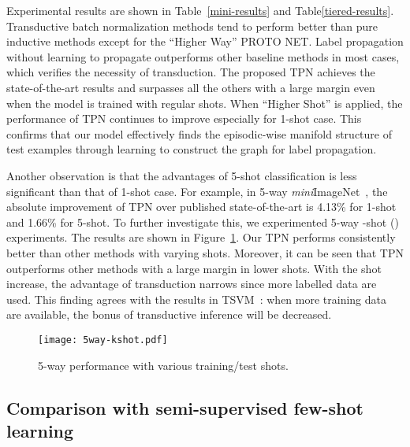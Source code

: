 \documentclass{article} \usepackage{iclr2019_conference,times}
\def\mini{{\textit{mini}ImageNet}}
\begin{document}
Experimental results are shown in Table~\ref{mini-results} and Table\ref{tiered-results}. Transductive batch normalization methods tend to perform better than pure inductive methods except for the ``Higher Way'' PROTO NET. Label propagation without learning to propagate outperforms other baseline methods in most cases, which verifies the necessity of transduction. The proposed TPN achieves the state-of-the-art results and surpasses all the others with a large margin even when the model is trained with regular shots. When ``Higher Shot'' is applied, the performance of TPN continues to improve especially for 1-shot case. 
This confirms that our model effectively finds the episodic-wise manifold structure of test examples through learning to construct the graph for label propagation.









Another observation is that the advantages of 5-shot classification is less significant than that of 1-shot case. For example, in 5-way \mini~, the absolute improvement of TPN over published state-of-the-art is 4.13\% for 1-shot and 1.66\% for 5-shot. 
To further investigate this, we experimented 5-way -shot () experiments. The results are shown in Figure~\ref{5waykshot}. Our TPN performs consistently better than other methods with varying shots. Moreover, it can be seen that TPN outperforms other methods with a large margin in lower shots. With the shot increase, the advantage of transduction narrows since more labelled data are used. This finding agrees with the results in TSVM~\citep{tsvm}: when more training data are available, the bonus of transductive inference will be decreased.  



\begin{figure}[t]
  \centering
  \texttt{[image: 5way-kshot.pdf]}
  \caption{5-way performance with various training/test shots.}
  \label{5waykshot}
\end{figure}


\subsection{Comparison with semi-supervised few-shot learning}
\end{document}
